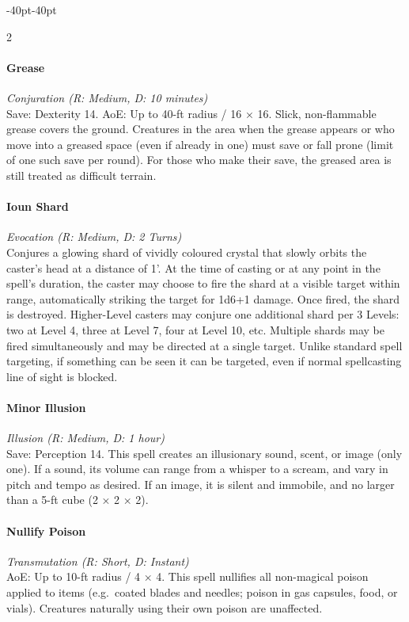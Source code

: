 \documentclass{book}
\begin{document}
\begin{adjustwidth}{-40pt}{-40pt}
\begin{multicols}{2}
\paragraph{Grease}\label{grease}
\emph{Conjuration (R: Medium, D: 10 minutes)}\\
Save: Dexterity 14. AoE: Up to 40-ft radius / 16 × 16. Slick,
non-flammable grease covers the ground. Creatures in the area when the
grease appears or who move into a greased space (even if already in one)
must save or fall prone (limit of one such save per round). For those
who make their save, the greased area is still treated as difficult
terrain.

\paragraph{Ioun Shard}\label{ioun-shard}
\emph{Evocation (R: Medium, D: 2 Turns)}\\
Conjures a glowing shard of vividly coloured crystal that slowly orbits
the caster's head at a distance of 1'. At the time of casting or at any
point in the spell's duration, the caster may choose to fire the shard
at a visible target within range, automatically striking the target for
1d6+1 damage. Once fired, the shard is destroyed. Higher-Level casters
may conjure one additional shard per 3 Levels: two at Level 4, three at
Level 7, four at Level 10, etc. Multiple shards may be fired
simultaneously and may be directed at a single target. Unlike standard
spell targeting, if something can be seen it can be targeted, even if
normal spellcasting line of sight is blocked.

\paragraph{Minor Illusion}\label{minor-illusion}
\emph{Illusion (R: Medium, D: 1 hour)}\\
Save: Perception 14. This spell creates an illusionary sound, scent, or
image (only one). If a sound, its volume can range from a whisper to a
scream, and vary in pitch and tempo as desired. If an image, it is
silent and immobile, and no larger than a 5-ft cube (2 × 2 × 2).

\paragraph{Nullify Poison}\label{nullify-poison}
\emph{Transmutation (R: Short, D: Instant)}\\
AoE: Up to 10-ft radius / 4 × 4. This spell nullifies all non-magical
poison applied to items (e.g.~coated blades and needles; poison in gas
capsules, food, or vials). Creatures naturally using their own poison
are unaffected.


\end{multicols}
\end{adjustwidth}
\end{document}
